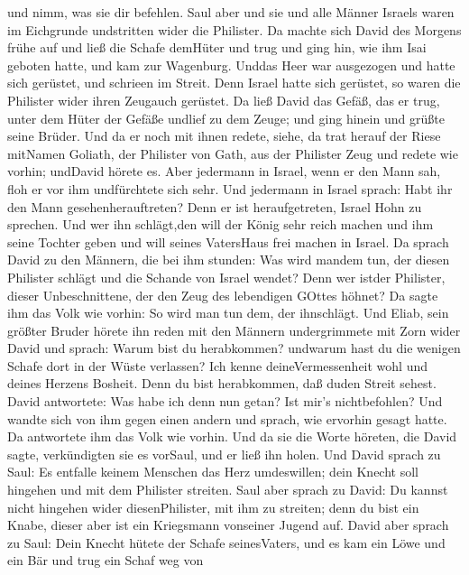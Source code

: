 und nimm, was sie dir befehlen.  Saul aber und sie und alle
Männer Israels waren im Eichgrunde undstritten wider die Philister.
 Da machte sich David des Morgens frühe auf und ließ die
Schafe demHüter und trug und ging hin, wie ihm Isai geboten hatte, und
kam zur Wagenburg. Unddas Heer war ausgezogen und hatte sich gerüstet,
und schrieen im Streit.  Denn Israel hatte sich gerüstet,
so waren die Philister wider ihren Zeugauch gerüstet.  Da
ließ David das Gefäß, das er trug, unter dem Hüter der Gefäße undlief zu
dem Zeuge; und ging hinein und grüßte seine Brüder.  Und da
er noch mit ihnen redete, siehe, da trat herauf der Riese mitNamen
Goliath, der Philister von Gath, aus der Philister Zeug und redete wie
vorhin; undDavid hörete es.  Aber jedermann in Israel, wenn
er den Mann sah, floh er vor ihm undfürchtete sich sehr. 
Und jedermann in Israel sprach: Habt ihr den Mann gesehenherauftreten?
Denn er ist heraufgetreten, Israel Hohn zu sprechen. Und wer ihn
schlägt,den will der König sehr reich machen und ihm seine Tochter geben
und will seines VatersHaus frei machen in Israel.  Da
sprach David zu den Männern, die bei ihm stunden: Was wird mandem tun,
der diesen Philister schlägt und die Schande von Israel wendet? Denn wer
istder Philister, dieser Unbeschnittene, der den Zeug des lebendigen
GOttes höhnet?  Da sagte ihm das Volk wie vorhin: So wird
man tun dem, der ihnschlägt.  Und Eliab, sein größter
Bruder hörete ihn reden mit den Männern undergrimmete mit Zorn wider
David und sprach: Warum bist du herabkommen? undwarum hast du die
wenigen Schafe dort in der Wüste verlassen? Ich kenne deineVermessenheit
wohl und deines Herzens Bosheit. Denn du bist herabkommen, daß duden
Streit sehest.  David antwortete: Was habe ich denn nun
getan? Ist mir's nichtbefohlen?  Und wandte sich von ihm
gegen einen andern und sprach, wie ervorhin gesagt hatte. Da antwortete
ihm das Volk wie vorhin.  Und da sie die Worte höreten, die
David sagte, verkündigten sie es vorSaul, und er ließ ihn holen.
 Und David sprach zu Saul: Es entfalle keinem Menschen das
Herz umdeswillen; dein Knecht soll hingehen und mit dem Philister
streiten.  Saul aber sprach zu David: Du kannst nicht
hingehen wider diesenPhilister, mit ihm zu streiten; denn du bist ein
Knabe, dieser aber ist ein Kriegsmann vonseiner Jugend auf.
 David aber sprach zu Saul: Dein Knecht hütete der Schafe
seinesVaters, und es kam ein Löwe und ein Bär und trug ein Schaf weg von
